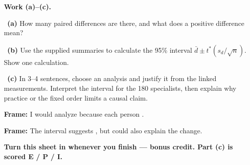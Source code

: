 \documentclass[11pt]{article}
\begin{document}
\newpage
\textbf{Work (a)--(c).}\par\smallskip

~\textbf{(a)} How many paired differences are there, and what does a positive difference mean?\par
\workspace{0.7in}

~\textbf{(b)} Use the supplied summaries to calculate the 95\% interval $\bar d\pm t^*(s_d/\sqrt n)$. Show one calculation.\par
\workspace{1.4in}

~\textbf{(c)} In 3--4 sentences, choose an analysis and justify it from the linked measurements. Interpret the interval for the 180 specialists, then explain why practice or the fixed order limits a causal claim.\par
\workspace{2.0in}

\begin{sentenceframebox}\raggedright\textbf{Frame:} I would analyze \blank[1.4in] because each person \blank[1.9in].\end{sentenceframebox}

\begin{sentenceframebox}\raggedright\textbf{Frame:} The interval suggests \blank[2.0in], but \blank[1.4in] could also explain the change.\end{sentenceframebox}

\textbf{Turn this sheet in whenever you finish --- bonus credit. Part (c) is scored E / P / I.}\par
\end{document}
